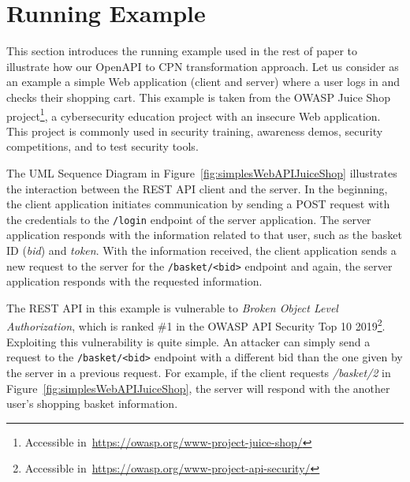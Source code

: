 \section{Running Example}
\label{sec:running_example}

This section introduces the running example used in the rest of paper to illustrate how our OpenAPI to CPN transformation approach.
% 
Let us consider as an example a simple Web application (client and server) where a user logs in and checks their shopping cart. This example is taken from the OWASP Juice Shop project\footnote{Accessible in~\url{https://owasp.org/www-project-juice-shop/}}, a cybersecurity education project with an insecure Web application. This project is commonly used in security training, awareness demos, security competitions, and to test security tools. 

The UML Sequence Diagram in Figure~\ref{fig:simplesWebAPIJuiceShop} illustrates the interaction between the REST API client and the server. In the beginning, the client application initiates communication by sending a POST request with the credentials to the \texttt{/login} endpoint of the server application. The server application responds with the information related to that user, such as the basket ID (\textit{bid}) and \textit{token}. With the information received, the client application sends a new request to the server for the \texttt{/basket/<bid>} endpoint and again, the server application responds with the requested information.

The REST API in this example is vulnerable to {\em Broken Object Level Authorization}, which is ranked \#1 in the OWASP API Security Top 10 2019\footnote{Accessible in~\url{https://owasp.org/www-project-api-security/}}. Exploiting this vulnerability is quite simple. An attacker can simply send a request to the \texttt{/basket/<bid>} endpoint with a   different bid than the one given by the server in a previous request. For example, if the client requests \textit{/basket/2} in Figure~\ref{fig:simplesWebAPIJuiceShop}, the server will respond with the another user's shopping basket information. 


